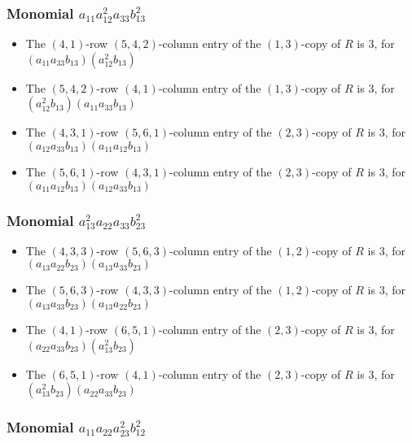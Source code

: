 \documentclass{article}
\begin{document}
\subsubsection{Monomial $ a_{11} a_{12}^{2} a_{33} b_{13}^{2} $}

\begin{itemize}
\item The $(4, 1)$-row $(5, 4, 2)$-column entry of the $ \left(1, 3\right) $-copy of $R$ is $ 3 $, for $( a_{11} a_{33} b_{13} )( a_{12}^{2} b_{13} )$ 
\item The $(5, 4, 2)$-row $(4, 1)$-column entry of the $ \left(1, 3\right) $-copy of $R$ is $ 3 $, for $( a_{12}^{2} b_{13} )( a_{11} a_{33} b_{13} )$ 
\item The $(4, 3, 1)$-row $(5, 6, 1)$-column entry of the $ \left(2, 3\right) $-copy of $R$ is $ 3 $, for $( a_{12} a_{33} b_{13} )( a_{11} a_{12} b_{13} )$ 
\item The $(5, 6, 1)$-row $(4, 3, 1)$-column entry of the $ \left(2, 3\right) $-copy of $R$ is $ 3 $, for $( a_{11} a_{12} b_{13} )( a_{12} a_{33} b_{13} )$ 
\end{itemize}
\subsubsection{Monomial $ a_{13}^{2} a_{22} a_{33} b_{23}^{2} $}

\begin{itemize}
\item The $(4, 3, 3)$-row $(5, 6, 3)$-column entry of the $ \left(1, 2\right) $-copy of $R$ is $ 3 $, for $( a_{13} a_{22} b_{23} )( a_{13} a_{33} b_{23} )$ 
\item The $(5, 6, 3)$-row $(4, 3, 3)$-column entry of the $ \left(1, 2\right) $-copy of $R$ is $ 3 $, for $( a_{13} a_{33} b_{23} )( a_{13} a_{22} b_{23} )$ 
\item The $(4, 1)$-row $(6, 5, 1)$-column entry of the $ \left(2, 3\right) $-copy of $R$ is $ 3 $, for $( a_{22} a_{33} b_{23} )( a_{13}^{2} b_{23} )$ 
\item The $(6, 5, 1)$-row $(4, 1)$-column entry of the $ \left(2, 3\right) $-copy of $R$ is $ 3 $, for $( a_{13}^{2} b_{23} )( a_{22} a_{33} b_{23} )$ 
\end{itemize}
\subsubsection{Monomial $ a_{11} a_{22} a_{23}^{2} b_{12}^{2} $}
\end{document}
